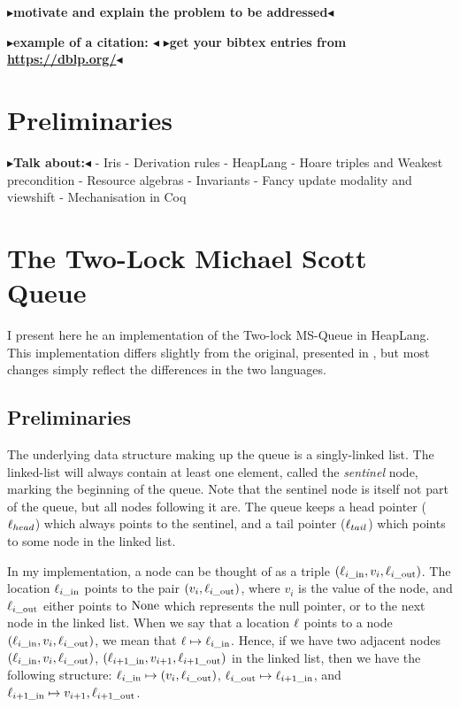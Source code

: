 \documentclass[twoside,11pt,openright]{report}
\newcommand{\locin}[1]{\loc_{#1\_\text{in}}}
\newcommand{\locout}[1]{\loc_{#1\_\text{out}}}
\newcommand{\todo}[1]{{\color[rgb]{.5,0,0}\textbf{$\blacktriangleright$#1$\blacktriangleleft$}}}
\begin{document}
\todo{motivate and explain the problem to be addressed}

\todo{example of a citation: \cite{DBLP:conf/podc/MichaelS96}}
\todo{get your bibtex entries from \url{https://dblp.org/}}


\chapter{Preliminaries}
\label{ch:preliminaries}
\todo{Talk about:}
- Iris
- Derivation rules
- HeapLang
- Hoare triples and Weakest precondition
- Resource algebras
- Invariants
- Fancy update modality and viewshift
- Mechanisation in Coq


\chapter{The Two-Lock Michael Scott Queue}

I present here he an implementation of the Two-lock MS-Queue in HeapLang. This implementation differs slightly from the original, presented in \cite{DBLP:conf/podc/MichaelS96}, but most changes simply reflect the differences in the two languages.


\section{Preliminaries}

The underlying data structure making up the queue is a singly-linked list. The linked-list will always contain at least one element, called the \emph{sentinel} node, marking the beginning of the queue. Note that the sentinel node is itself not part of the queue, but all nodes following it are. The queue keeps a head pointer ($\ell_{head}$) which always points to the sentinel, and a tail pointer ($\ell_{tail}$) which points to some node in the linked list.

In my implementation, a node can be thought of as a triple $(\locin{i}, v_i, \locout{i})$. The location $\locin{i}$ points to the pair $(v_i, \locout{i})$, where $v_i$ is the value of the node, and $\locout{i}$ either points to $\operatorname{None}$ which represents the null pointer, or to the next node in the linked list. When we say that a location $\ell$ points to a node $(\locin{i}, v_i, \locout{i})$, we mean that $\loc \mapsto \locin{i}$. Hence, if we have two adjacent nodes $(\locin{i}, v_i, \locout{i})$, $(\locin{i+1}, v_{i+1}, \locout{i+1})$ in the linked list, then we have the following structure: $\locin{i} \mapsto (v_i, \locout{i})$, $\locout{i} \mapsto \locin{i+1}$, and $\locin{i+1} \mapsto v_{i+1}, \locout{i+1}$.
\end{document}
